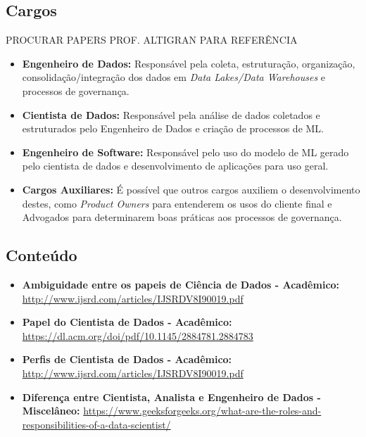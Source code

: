 \documentclass[portugues, 12pt, a4paper]{article}
\begin{document}
\subsection{Cargos}

{PROCURAR PAPERS PROF. ALTIGRAN PARA REFERÊNCIA}

\begin{itemize}
\item \textbf{Engenheiro de Dados:} Responsável pela coleta, estruturação, organização, consolidação/integração dos dados em \textit{Data Lakes/Data Warehouses} e processos de governança.

\item \textbf{Cientista de Dados:} Responsável pela análise de dados coletados e estruturados pelo Engenheiro de Dados e criação de processos de ML.

\item \textbf{Engenheiro de Software:} Responsável pelo uso do modelo de ML gerado pelo cientista de dados e desenvolvimento de aplicações para uso geral.

\item \textbf{Cargos Auxiliares:} É possível que outros cargos auxiliem o desenvolvimento destes, como \textit{Product Owners} para entenderem os usos do cliente final e Advogados para determinarem boas práticas aos processos de governança.

\end{itemize}

\subsection{Conteúdo}

\begin{itemize}
\item \textbf{Ambiguidade entre os papeis de Ciência de Dados - Acadêmico:} \url{http://www.ijsrd.com/articles/IJSRDV8I90019.pdf}

\item \textbf{Papel do Cientista de Dados - Acadêmico:} \url{https://dl.acm.org/doi/pdf/10.1145/2884781.2884783}

\item \textbf{Perfis de Cientista de Dados - Acadêmico:} \url{http://www.ijsrd.com/articles/IJSRDV8I90019.pdf}

\item \textbf{Diferença entre Cientista, Analista e Engenheiro de Dados - Miscelâneo:} \url{https://www.geeksforgeeks.org/what-are-the-roles-and-responsibilities-of-a-data-scientist/}
\end{itemize}
\end{document}
